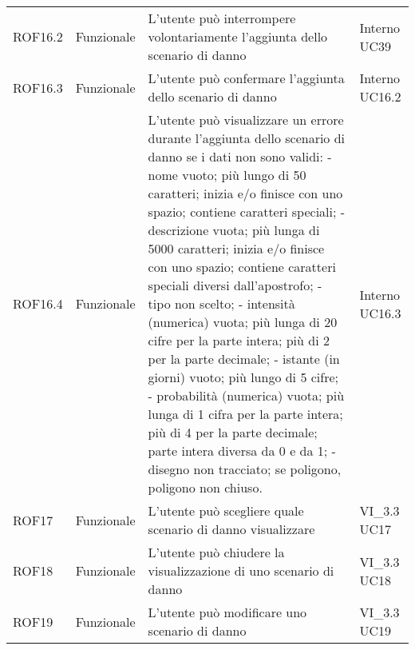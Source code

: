 \begin{longtable}{p{2cm}!{\VRule[1pt]}p{2cm}!{\VRule[1pt]}p{5cm}!{\VRule[1pt]}p{1.5cm}}
	ROF16.2                          & Funzionale\newline               & L'utente può interrompere volontariamente l'aggiunta dello scenario di danno                                             & Interno \newline UC39        
	\\
	ROF16.3                          & Funzionale\newline               & L'utente può confermare l'aggiunta dello scenario di danno                                                               & Interno \newline UC16.2      
	\\
	ROF16.4&Funzionale\newline  & L'utente può visualizzare un errore durante l'aggiunta dello scenario di danno se i dati non sono validi:
	- nome vuoto; più lungo di 50 caratteri; inizia e/o
	finisce con uno spazio; contiene caratteri speciali;
	- descrizione vuota; più lunga di 5000 caratteri;
	inizia e/o finisce con uno spazio; contiene
	caratteri speciali diversi dall'apostrofo;
	- tipo non scelto;
	- intensità (numerica) vuota; più lunga di 20 cifre per la
	parte intera; più di 2 per la parte decimale;
	- istante (in giorni) vuoto; più lungo di 5 cifre;
	- probabilità (numerica) vuota; più lunga di 1 cifra per la
	parte intera; più di 4 per la parte decimale; parte
	intera diversa da 0 e da 1;
	- disegno non tracciato; se poligono, poligono non
	chiuso. & Interno \newline UC16.3
	\\
	ROF17                            & Funzionale\newline               & L'utente può scegliere quale scenario di danno visualizzare                                                              & VI_3.3 \newline UC17         
	\\
	ROF18                            & Funzionale\newline               & L'utente può chiudere la visualizzazione di uno scenario di danno                                                        & VI_3.3 \newline UC18         
	\\
	ROF19                            & Funzionale\newline               & L'utente può modificare uno scenario di danno                                                                            & VI_3.3 \newline UC19         

\end{longtable}
